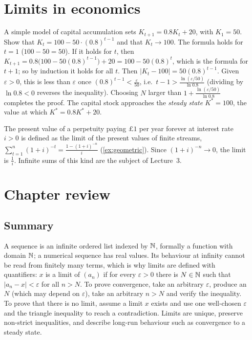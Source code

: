 \section{Limits in economics}\label{sec:limits-econ}

\begin{example}
A simple model of capital accumulation sets $K_{t+1}=0.8K_t+20$, with $K_1=50$. Show that $K_t=100-50\cdot(0.8)^{t-1}$ and that
$K_t\to100$.
\solution
The formula holds for $t=1$ ($100-50=50$). If it holds for $t$, then
$K_{t+1}=0.8\big(100-50(0.8)^{t-1}\big)+20=100-50(0.8)^t$, which is the formula for $t+1$; so by induction it holds for all $t$.
Then $|K_t-100|=50(0.8)^{t-1}$. Given $\varepsilon>0$, this is less than $\varepsilon$ once $(0.8)^{t-1}<\frac\varepsilon{50}$, i.e.\
$t-1>\frac{\ln(\varepsilon/50)}{\ln0.8}$ (dividing by $\ln0.8<0$ reverses the inequality). Choosing $N$ larger than
$1+\frac{\ln(\varepsilon/50)}{\ln0.8}$ completes the proof. The capital stock approaches the \emph{steady state} $K^*=100$, the value
at which $K^*=0.8K^*+20$.
\end{example}

\begin{external}
The present value of a perpetuity paying $\pounds1$ per year forever at interest rate $i>0$ is defined as the limit of the
present values of finite streams, $\sum_{t=1}^{n}(1+i)^{-t}=\frac{1-(1+i)^{-n}}{i}$ (\cref{ex:geometric}). Since $(1+i)^{-n}\to0$, the
limit is $\frac1i$. Infinite sums of this kind are the subject of Lecture~3.
\end{external}

\section{Chapter review}
\subsection*{Summary}
A sequence is an infinite ordered list indexed by $\mathbb{N}$, formally a function with domain $\mathbb{N}$; a numerical sequence has real
values. Its behaviour at infinity cannot be read from finitely many terms, which is why limits are defined with quantifiers:
$x$ is a limit of $(a_n)$ if for every $\varepsilon>0$ there is $N\in\mathbb{N}$ such that $|a_n-x|<\varepsilon$ for all $n>N$. To prove
convergence, take an arbitrary $\varepsilon$, produce an $N$ (which may depend on $\varepsilon$), take an arbitrary $n>N$ and verify the
inequality. To prove that there is no limit, assume a limit $x$ exists and use one well-chosen $\varepsilon$ and the triangle
inequality to reach a contradiction. Limits are unique, preserve non-strict inequalities, and describe long-run behaviour such
as convergence to a steady state.

